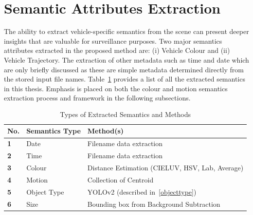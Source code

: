 \section{Semantic Attributes Extraction}
\label{section:semanticsExtraction}

The ability to extract vehicle-specific semantics from the scene can present deeper insights that are valuable for surveillance purposes.
Two major semantics attributes extracted in the proposed method are: (i) Vehicle Colour and (ii) Vehicle Trajectory. The extraction of other metadata such as time and date which are only briefly discussed as these are simple metadata determined directly from the stored input file names.
Table~\ref{table:semantics} provides a list of all the extracted semantics in this thesis.
Emphasis is placed on both the colour and motion semantics extraction process and framework in the following subsections.

\begin{table} \centering
\caption {Types of Extracted Semantics and Methods}
\label{table:semantics}
\begin{tabular}{|l|l|l|}
\hline
\textbf{No.} & \textbf{Semantics Type} & \textbf{Method(s)}                                                                                                          \\ \hline
\textbf{1}   & Date                    & Filename data extraction                                                                                                         \\ \hline
\textbf{2}   & Time                    & Filename data extraction                                                                                                         \\ \hline
\textbf{3}   & Colour                   & 
Distance Estimation (CIELUV, HSV, Lab, Average)
\\ \hline
\textbf{4}   & Motion                  & 
Collection of Centroid 
\\ \hline
\textbf{5}   & Object Type             & YOLOv2 (described in~\ref{objecttype})                                                                                                               \\ \hline
\textbf{6}   & Size                    & Bounding box from Background Subtraction                                                                                                      \\ \hline
\end{tabular}

\end{table}

